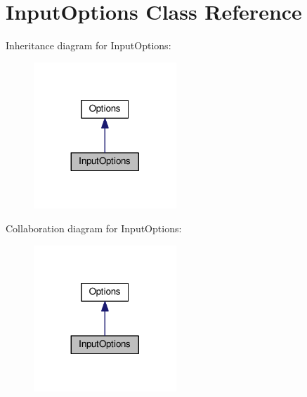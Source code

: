\hypertarget{classInputOptions}{}\section{Input\+Options Class Reference}
\label{classInputOptions}


Inheritance diagram for Input\+Options\+:
\nopagebreak
\begin{figure}[H]
\begin{center}
\leavevmode
\includegraphics[width=152pt]{classInputOptions__inherit__graph}
\end{center}
\end{figure}


Collaboration diagram for Input\+Options\+:
\nopagebreak
\begin{figure}[H]
\begin{center}
\leavevmode
\includegraphics[width=152pt]{classInputOptions__coll__graph}
\end{center}
\end{figure}
